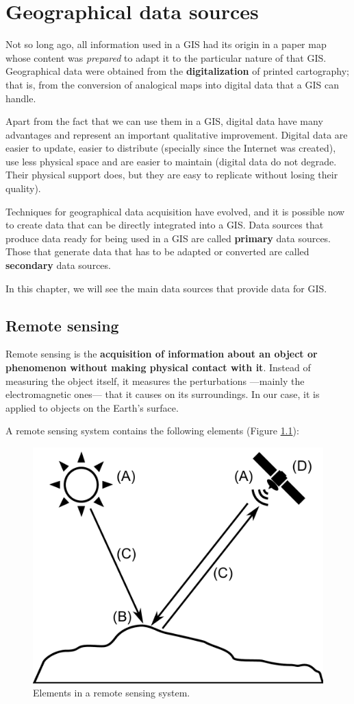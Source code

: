 
\chapter{Geographical data sources}

\pagestyle{fancy}

Not so long ago, all information used in a GIS had its origin in a paper map whose content was \emph{prepared} to adapt it to the particular nature of that GIS. Geographical data were obtained from the \textbf{digitalization} of printed cartography; that is, from the conversion of analogical maps into digital data that a GIS can handle.

Apart from the fact that we can use them in a GIS, digital data have many advantages and represent an important qualitative improvement. Digital data are easier to update, easier to distribute (specially since the Internet was created), use less physical space and are easier to maintain (digital data do not degrade. Their physical support does, but they are easy to replicate without losing their quality).

Techniques for geographical data acquisition have evolved, and it is possible now to create data that can be directly integrated into a GIS. Data sources that produce data ready for being used in a GIS are called \textbf{primary} data sources. Those that generate data that has to be adapted or converted are called \textbf{secondary} data sources.

In this chapter, we will see the main data sources that provide data for GIS.

\section{Remote sensing}

Remote sensing is the \textbf{acquisition of information about an object or phenomenon without making physical contact with it}. Instead of measuring the object itself, it measures the perturbations ---mainly the electromagnetic ones--- that it causes on its surroundings. In our case, it is applied to objects on the Earth's surface.

A remote sensing system contains the following elements (Figure \ref{Fig:Elements_remote_sensing}):

\begin{figure}[!hbt]   
\centering
\includegraphics[width=.6\textwidth]{Data_sources/Elements_remote_sensing.pdf}
\caption{\small Elements in a remote sensing system.}
\label{Fig:Elements_remote_sensing} 
\end{figure}


